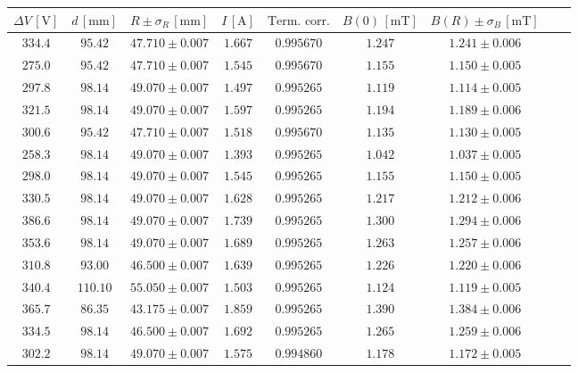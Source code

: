 \documentclass[]{article}
\begin{document}
\begin{table}[H]
    \centering

\begin{tabular}{||c|c|c|c|c|c|c|c|c||}
    \hline
    $\Delta V\, [\text{V}] $ & $d\, [\text{mm}] $ & $R \pm \sigma_R\, [\text{mm}] $ & $I\, [\text{A}] $ & $\text{Term. corr.}$ & $B(0)\, [\text{mT}] $ & $B(R) \pm \sigma_B\, [\text{mT}] $ \\
    \hline\hline
 
    $334.4$ & $95.42$ & $47.710 \pm 0.007$ & $1.667$ & $0.995670$ & $1.247$ & $1.241 \pm 0.006$ \\\hline
    $275.0$ & $95.42$ & $47.710 \pm 0.007$ & $1.545$ & $0.995670$ & $1.155$ & $1.150 \pm 0.005$ \\\hline
    $297.8$ & $98.14$ & $49.070 \pm 0.007$ & $1.497$ & $0.995265$ & $1.119$ & $1.114 \pm 0.005$ \\\hline
    $321.5$ & $98.14$ & $49.070 \pm 0.007$ & $1.597$ & $0.995265$ & $1.194$ & $1.189 \pm 0.006$ \\\hline
    $300.6$ & $95.42$ & $47.710 \pm 0.007$ & $1.518$ & $0.995670$ & $1.135$ & $1.130 \pm 0.005$ \\\hline
    $258.3$ & $98.14$ & $49.070 \pm 0.007$ & $1.393$ & $0.995265$ & $1.042$ & $1.037 \pm 0.005$ \\\hline
    $298.0$ & $98.14$ & $49.070 \pm 0.007$ & $1.545$ & $0.995265$ & $1.155$ & $1.150 \pm 0.005$ \\\hline
    $330.5$ & $98.14$ & $49.070 \pm 0.007$ & $1.628$ & $0.995265$ & $1.217$ & $1.212 \pm 0.006$ \\\hline
    $386.6$ & $98.14$ & $49.070 \pm 0.007$ & $1.739$ & $0.995265$ & $1.300$ & $1.294 \pm 0.006$ \\\hline
    $353.6$ & $98.14$ & $49.070 \pm 0.007$ & $1.689$ & $0.995265$ & $1.263$ & $1.257 \pm 0.006$ \\\hline
    $310.8$ & $93.00$ & $46.500 \pm 0.007$ & $1.639$ & $0.995265$ & $1.226$ & $1.220 \pm 0.006$ \\\hline
    $340.4$ &$110.10$ & $55.050 \pm 0.007$ & $1.503$ & $0.995265$ & $1.124$ & $1.119 \pm 0.005$ \\\hline
    $365.7$ & $86.35$ & $43.175 \pm 0.007$ & $1.859$ & $0.995265$ & $1.390$ & $1.384 \pm 0.006$ \\\hline
    $334.5$ & $98.14$ & $46.500 \pm 0.007$ & $1.692$ & $0.995265$ & $1.265$ & $1.259 \pm 0.006$ \\\hline
    $302.2$ & $98.14$ & $49.070 \pm 0.007$ & $1.575$ & $0.994860$ & $1.178$ & $1.172 \pm 0.005$ \\\hline

\end{tabular}
\end{table}
\end{document}
